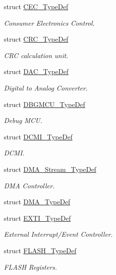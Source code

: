 \begin{DoxyCompactItemize}
struct \hyperlink{struct_c_e_c___type_def}{C\+E\+C\+\_\+\+Type\+Def}
\begin{DoxyCompactList}\small\item\em Consumer Electronics Control. \end{DoxyCompactList}\item 
struct \hyperlink{struct_c_r_c___type_def}{C\+R\+C\+\_\+\+Type\+Def}
\begin{DoxyCompactList}\small\item\em C\+RC calculation unit. \end{DoxyCompactList}\item 
struct \hyperlink{struct_d_a_c___type_def}{D\+A\+C\+\_\+\+Type\+Def}
\begin{DoxyCompactList}\small\item\em Digital to Analog Converter. \end{DoxyCompactList}\item 
struct \hyperlink{struct_d_b_g_m_c_u___type_def}{D\+B\+G\+M\+C\+U\+\_\+\+Type\+Def}
\begin{DoxyCompactList}\small\item\em Debug M\+CU. \end{DoxyCompactList}\item 
struct \hyperlink{struct_d_c_m_i___type_def}{D\+C\+M\+I\+\_\+\+Type\+Def}
\begin{DoxyCompactList}\small\item\em D\+C\+MI. \end{DoxyCompactList}\item 
struct \hyperlink{struct_d_m_a___stream___type_def}{D\+M\+A\+\_\+\+Stream\+\_\+\+Type\+Def}
\begin{DoxyCompactList}\small\item\em D\+MA Controller. \end{DoxyCompactList}\item 
struct \hyperlink{struct_d_m_a___type_def}{D\+M\+A\+\_\+\+Type\+Def}
\item 
struct \hyperlink{struct_e_x_t_i___type_def}{E\+X\+T\+I\+\_\+\+Type\+Def}
\begin{DoxyCompactList}\small\item\em External Interrupt/\+Event Controller. \end{DoxyCompactList}\item 
struct \hyperlink{struct_f_l_a_s_h___type_def}{F\+L\+A\+S\+H\+\_\+\+Type\+Def}
\begin{DoxyCompactList}\small\item\em F\+L\+A\+SH Registers. \end{DoxyCompactList}\item 

\end{DoxyCompactItemize}
